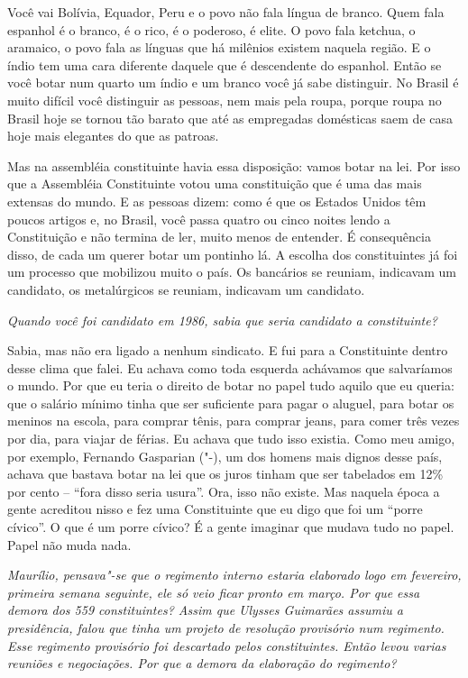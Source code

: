 Você vai Bolívia, Equador, Peru e o povo não fala língua de branco. Quem
fala espanhol é o branco, é o rico, é o poderoso, é elite. O povo fala
ketchua, o aramaico, o povo fala as línguas que há milênios existem
naquela região. E o índio tem uma cara diferente daquele que é
descendente do espanhol. Então se você botar num quarto um índio e um
branco você já sabe distinguir. No Brasil é muito difícil você
distinguir as pessoas, nem mais pela roupa, porque roupa no Brasil hoje
se tornou tão barato que até as empregadas domésticas saem de casa hoje
mais elegantes do que as patroas.

Mas na assembléia constituinte havia essa disposição: vamos botar na
lei. Por isso que a Assembléia Constituinte votou uma constituição que é
uma das mais extensas do mundo. E as pessoas dizem: como é que os
Estados Unidos têm poucos artigos e, no Brasil, você passa quatro ou
cinco noites lendo a Constituição e não termina de ler, muito menos de
entender. É consequência disso, de cada um querer botar um pontinho lá.
A escolha dos constituintes já foi um processo que mobilizou muito o
país. Os bancários se reuniam, indicavam um candidato, os metalúrgicos
se reuniam, indicavam um candidato.

\medskip

\emph{Quando você foi candidato em 1986, sabia que seria candidato a
constituinte?}

Sabia, mas não era ligado a nenhum sindicato. E fui
para a Constituinte dentro desse clima que falei. Eu achava como toda
esquerda achávamos que salvaríamos o mundo. Por que eu teria o direito
de botar no papel tudo aquilo que eu queria: que o salário mínimo tinha
que ser suficiente para pagar o aluguel, para botar os meninos na
escola, para comprar tênis, para comprar jeans, para comer três vezes
por dia, para viajar de férias. Eu achava que tudo isso existia. Como
meu amigo, por exemplo, Fernando Gasparian ("-), um dos homens mais
dignos desse país, achava que bastava botar na lei que os juros tinham
que ser tabelados em 12\% por cento -- ``fora disso seria usura''. Ora,
isso não existe. Mas naquela época a gente acreditou nisso e fez uma
Constituinte que eu digo que foi um ``porre cívico''. O que é um porre
cívico? É a gente imaginar que mudava tudo no papel. Papel não muda
nada.

\medskip

\emph{Maurílio, pensava"-se que o regimento interno estaria elaborado
logo em fevereiro, primeira semana seguinte, ele só veio ficar pronto em
março. Por que essa demora dos 559 constituintes? Assim que Ulysses
Guimarães assumiu a presidência, falou que tinha um projeto de resolução
provisório num regimento. Esse regimento provisório foi descartado pelos
constituintes. Então levou varias reuniões e negociações. Por que a
demora da elaboração do regimento?}

